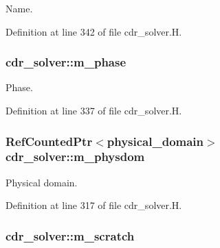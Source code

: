 Name. 



Definition at line 342 of file cdr\+\_\+solver.\+H.

\subsubsection[{\texorpdfstring{m\+\_\+phase}{m_phase}}]{ cdr\+\_\+solver\+::m\+\_\+phase\hspace{0.3cm}{\ttfamily [protected]}}\hypertarget{classcdr__solver_aac456cdaeac23bf19505abcfb1515963}{}\label{classcdr__solver_aac456cdaeac23bf19505abcfb1515963}


Phase. 



Definition at line 337 of file cdr\+\_\+solver.\+H.

\subsubsection[{\texorpdfstring{m\+\_\+physdom}{m_physdom}}]{\setlength{\rightskip}{0pt plus 5cm}Ref\+Counted\+Ptr$<${\bf physical\+\_\+domain}$>$ cdr\+\_\+solver\+::m\+\_\+physdom\hspace{0.3cm}{\ttfamily [protected]}}\hypertarget{classcdr__solver_acbb78d3dc39ac7ed13be76611b0b0619}{}\label{classcdr__solver_acbb78d3dc39ac7ed13be76611b0b0619}


Physical domain. 



Definition at line 317 of file cdr\+\_\+solver.\+H.

\subsubsection[{\texorpdfstring{m\+\_\+scratch}{m_scratch}}]{ cdr\+\_\+solver\+::m\+\_\+scratch\hspace{0.3cm}{\ttfamily [protected]}}\hypertarget{classcdr__solver_ac816720ca6b0e21b719044c1a9b70f92}{}\label{classcdr__solver_ac816720ca6b0e21b719044c1a9b70f92}


